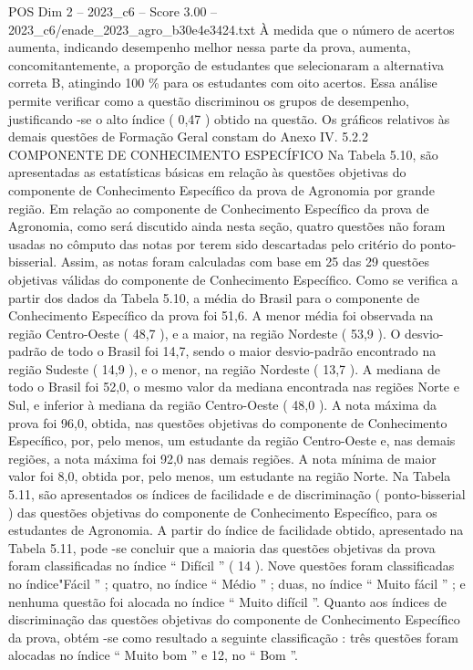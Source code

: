 \begin{textsample}{POS Dim 2 – 2023\_c6 – Score 3.00 – 2023\_c6/enade\_2023\_agro\_b30e4e3424.txt}
À medida que o número de acertos aumenta, indicando desempenho melhor nessa parte da prova, aumenta, concomitantemente, a proporção de estudantes que selecionaram a alternativa correta B, atingindo 100 \% para os estudantes com oito acertos.
Essa análise permite verificar como a questão discriminou os grupos de desempenho, justificando -se o alto índice ( 0,47 ) obtido na questão.
Os gráficos relativos às demais questões de Formação Geral constam do Anexo IV. 5.2.2 COMPONENTE DE CONHECIMENTO ESPECÍFICO Na Tabela 5.10, são apresentadas as estatísticas básicas em relação às questões objetivas do componente de Conhecimento Específico da prova de Agronomia por grande região.
Em relação ao componente de Conhecimento Específico da prova de Agronomia, como será discutido ainda nesta seção, quatro questões não foram usadas no cômputo das notas por terem sido descartadas pelo critério do ponto-bisserial.
Assim, as notas foram calculadas com base em 25 das 29 questões objetivas válidas do componente de Conhecimento Específico.
Como se verifica a partir dos dados da Tabela 5.10, a média do Brasil para o componente de Conhecimento Específico da prova foi 51,6.
A menor média foi observada na região Centro-Oeste ( 48,7 ), e a maior, na região Nordeste ( 53,9 ).
O desvio-padrão de todo o Brasil foi 14,7, sendo o maior desvio-padrão encontrado na região Sudeste ( 14,9 ), e o menor, na região Nordeste ( 13,7 ).
A mediana de todo o Brasil foi 52,0, o mesmo valor da mediana encontrada nas regiões Norte e Sul, e inferior à mediana da região Centro-Oeste ( 48,0 ).
A nota máxima da prova foi 96,0, obtida, nas questões objetivas do componente de Conhecimento Específico, por, pelo menos, um estudante da região Centro-Oeste e, nas demais regiões, a nota máxima foi 92,0 nas demais regiões.
A nota mínima de maior valor foi 8,0, obtida por, pelo menos, um estudante na região Norte.
Na Tabela 5.11, são apresentados os índices de facilidade e de discriminação ( ponto-bisserial ) das questões objetivas do componente de Conhecimento Específico, para os estudantes de Agronomia.
A partir do índice de facilidade obtido, apresentado na Tabela 5.11, pode -se concluir que a maioria das questões objetivas da prova foram classificadas no índice “ Difícil ” ( 14 ).
Nove questões foram classificadas no índice"Fácil ” ; quatro, no índice “ Médio ” ; duas, no índice “ Muito fácil ” ; e nenhuma questão foi alocada no índice “ Muito difícil ”.
Quanto aos índices de discriminação das questões objetivas do componente de Conhecimento Específico da prova, obtém -se como resultado a seguinte classificação : três questões foram alocadas no índice “ Muito bom ” e 12, no “ Bom ”.

\end{textsample}
